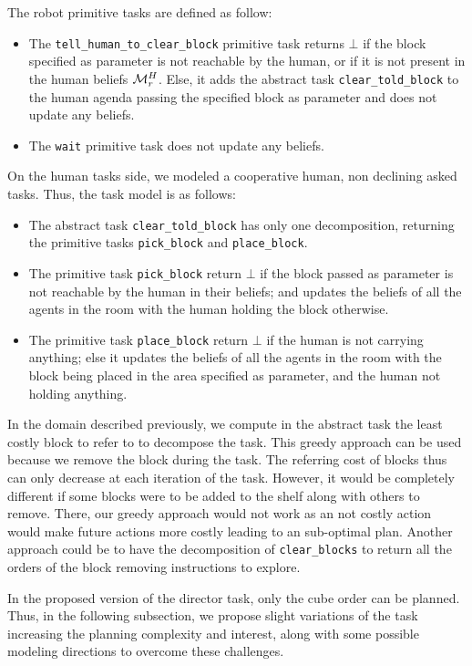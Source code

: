 \documentclass[a4paper,11pt,twoside]{StyleThese}
\begin{document}
The robot primitive tasks are defined as follow:
\begin{itemize}
\item The \verb'tell_human_to_clear_block' primitive task returns $\bot$ if the block specified as parameter is not reachable by the human, or if it is not present in the human beliefs $\mathcal{M}^H_r$. Else, it adds the abstract task \verb'clear_told_block' to the human agenda passing the specified block as parameter and does not update any beliefs.
\item The \verb'wait' primitive task does not update any beliefs.
\end{itemize}

On the human tasks side, we modeled a cooperative human, non declining asked tasks. Thus, the task model is as follows:
\begin{itemize}
\item The abstract task \verb'clear_told_block' has only one decomposition, returning the primitive tasks \verb'pick_block' and \verb'place_block'.
\item The primitive task \verb'pick_block' return $\bot$ if the block passed as parameter is not reachable by the human in their beliefs; and updates the beliefs of all the agents in the room with the human holding the block otherwise.
\item The primitive task \verb'place_block' return $\bot$ if the human is not carrying anything; else it updates the beliefs of all the agents in the room with the block being placed in the area specified as parameter, and the human not holding anything.
\end{itemize}

In the domain described previously, we compute in the abstract task the least costly block to refer to to decompose the task. This greedy approach can be used because we remove the block during the task. The referring cost of blocks thus can only decrease at each iteration of the task. However, it would be completely different if some blocks were to be added to the shelf along with others to remove. There, our greedy approach would not work as an not costly action would make future actions more costly leading to an sub-optimal plan. Another approach could be to have the decomposition of \verb'clear_blocks' to return all the orders of the block removing instructions to explore.

In the proposed version of the director task, only the cube order can be planned. Thus, in the following subsection, we propose slight variations of the task increasing the planning complexity and interest, along with some possible modeling directions to overcome these challenges.
\end{document}
